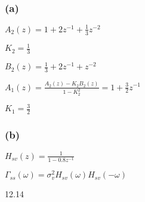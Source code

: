 \documentclass{article}
\begin{document}
\subsubsection*{(a)}
$A_{2}(z)=1+2z^{-1}+\frac{1}{3}z^{-2}$\par
$K_{2}=\frac{1}{3}$\par
$B_{2}(z)=\frac{1}{3}+2z^{-1}+z^{-2}$\par
$A_{1}(z)=\frac{A_{2}(z)-K_{2}B_{2}(z)}{1-K_{2}^{2}}=1+\frac{3}{2}z^{-1}$\par
$K_{1}=\frac{3}{2}$\par
\subsubsection*{(b)}
$H_{sv}(z)=\frac{1}{1-0.8z^{-1}}$\par
$\Gamma_{ss}(\omega)=\sigma_{v}^{2}H_{sv}(\omega)H_{sv}(-\omega)$\par
12.14
\clearpage
\end{document}

